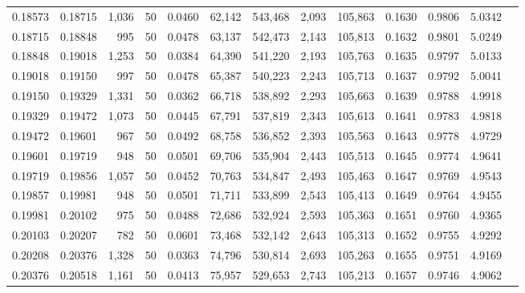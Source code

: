 \begin{tabular}{rrrrrrrrrrrrr}
0.18573 & 0.18715 & 1,036 &  50 &                                     0.0460 &  62,142 & 543,468 &   2,093 & 105,863 & 0.1630 & 0.9806 & 5.0342 \\
0.18715 & 0.18848 &   995 &  50 &                                     0.0478 &  63,137 & 542,473 &   2,143 & 105,813 & 0.1632 & 0.9801 & 5.0249 \\
0.18848 & 0.19018 & 1,253 &  50 &                                     0.0384 &  64,390 & 541,220 &   2,193 & 105,763 & 0.1635 & 0.9797 & 5.0133 \\
0.19018 & 0.19150 &   997 &  50 &                                     0.0478 &  65,387 & 540,223 &   2,243 & 105,713 & 0.1637 & 0.9792 & 5.0041 \\
0.19150 & 0.19329 & 1,331 &  50 &                                     0.0362 &  66,718 & 538,892 &   2,293 & 105,663 & 0.1639 & 0.9788 & 4.9918 \\
0.19329 & 0.19472 & 1,073 &  50 &                                     0.0445 &  67,791 & 537,819 &   2,343 & 105,613 & 0.1641 & 0.9783 & 4.9818 \\
0.19472 & 0.19601 &   967 &  50 &                                     0.0492 &  68,758 & 536,852 &   2,393 & 105,563 & 0.1643 & 0.9778 & 4.9729 \\
0.19601 & 0.19719 &   948 &  50 &                                     0.0501 &  69,706 & 535,904 &   2,443 & 105,513 & 0.1645 & 0.9774 & 4.9641 \\
0.19719 & 0.19856 & 1,057 &  50 &                                     0.0452 &  70,763 & 534,847 &   2,493 & 105,463 & 0.1647 & 0.9769 & 4.9543 \\
0.19857 & 0.19981 &   948 &  50 &                                     0.0501 &  71,711 & 533,899 &   2,543 & 105,413 & 0.1649 & 0.9764 & 4.9455 \\
0.19981 & 0.20102 &   975 &  50 &                                     0.0488 &  72,686 & 532,924 &   2,593 & 105,363 & 0.1651 & 0.9760 & 4.9365 \\
0.20103 & 0.20207 &   782 &  50 &                                     0.0601 &  73,468 & 532,142 &   2,643 & 105,313 & 0.1652 & 0.9755 & 4.9292 \\
0.20208 & 0.20376 & 1,328 &  50 &                                     0.0363 &  74,796 & 530,814 &   2,693 & 105,263 & 0.1655 & 0.9751 & 4.9169 \\
0.20376 & 0.20518 & 1,161 &  50 &                                     0.0413 &  75,957 & 529,653 &   2,743 & 105,213 & 0.1657 & 0.9746 & 4.9062 \\

\end{tabular}
